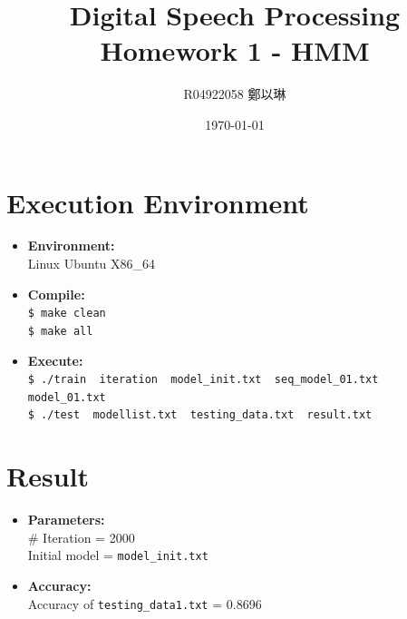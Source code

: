 \documentclass[12pt]{article}
\title{\textbf{Digital Speech Processing}\\ Homework 1 - HMM}
\author{R04922058 鄭以琳}
\date{\large \today}
\begin{document}
\maketitle

\section{Execution Environment}
    \begin{itemize}
        \item \textbf{Environment:} \\
            Linux Ubuntu X86\_64
        \item \textbf{Compile:}\\
            \verb|$ make clean| \\
            \verb|$ make all|
        \item \textbf{Execute:}\\
            \verb|$ ./train  iteration  model_init.txt  seq_model_01.txt  model_01.txt| \\
            \verb|$ ./test  modellist.txt  testing_data.txt  result.txt|
    \end{itemize}

\section{Result}
    \begin{itemize}
        \item \textbf{Parameters:} \\
            \# Iteration = 2000 \\
            Initial model = \verb|model_init.txt|
        \item \textbf{Accuracy:}\\
            Accuracy of \verb|testing_data1.txt| = 0.8696
    \end{itemize}
\end{document}

